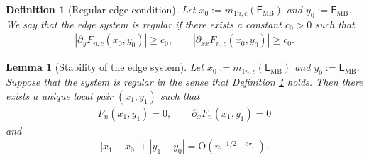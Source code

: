 \documentclass[10pt,a4paper]{amsart}
\newtheorem{definition}{Definition}
\newtheorem{lemma}{Lemma}
\begin{document}
\begin{definition}[Regular-edge condition]\label{def_regularedge}
	Let $x_0:=m_{1n,c}(\mathsf E_{\mathrm{MB}})$ and $y_0:=\mathsf E_{\mathrm{MB}}$. We say that the edge system is regular if there exists a constant $c_0>0$ such that
	\begin{align}\label{eq_regular_edge_condition}
		|\partial_yF_{n,c}(x_0,y_0)|\ge c_0,
		\qquad
		|\partial_{xx}F_{n,c}(x_0,y_0)|\ge c_0.
	\end{align}
\end{definition}

\begin{lemma}[Stability of the edge system]
	\label{lem_stabilityargument}
	Let $x_0:=m_{1n,c}(\mathsf E_{\mathrm{MB}})$ and $y_0:=\mathsf E_{\mathrm{MB}}$. Suppose that the system is regular in the sense that Definition \ref{def_regularedge} holds.
	Then there exists a unique local pair $(x_1,y_1)$ such that
	\begin{align*}
		F_n(x_1,y_1)=0,
		\qquad
		\partial_xF_n(x_1,y_1)=0
	\end{align*}
	and
	\begin{align*}
		|x_1-x_0|+|y_1-y_0|=\mathrm{O}(n^{-1/2+c_{\Xi,1}}).
	\end{align*}
\end{lemma}
\end{document}
